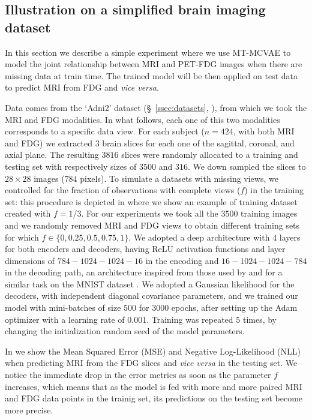 \subsection{Illustration on a simplified brain imaging dataset}
\label{sec:proof_of_concept}

In this section we describe a simple experiment where we use MT-MCVAE to model the joint relationship between MRI and PET-FDG images when there are missing data at train time.
The trained model will be then applied on test data to predict MRI from FDG and \textit{vice versa}.

Data comes from the `Adni2' dataset (\S~\ref{ssec:datasets}, ), from which we took the MRI and FDG modalities.
In what follows, each one of this two modalities corresponds to a specific data view.
For each subject ($n=424$, with both MRI and FDG) we extracted $3$ brain slices for each one of the sagittal, coronal, and axial plane.
The resulting $3816$ slices were randomly allocated to a training and testing set with respectively sizes of $3500$ and $316$.
We down sampled the slices to $28 \times 28$ images ($784$ pixels).
%
To simulate a datasets with missing views, we controlled for the fraction of observations with complete views ($f$) in the training set:
this procedure is depicted in  where we show an example of training dataset created with $f=1/3$.
%
For our experiments we took all the $3500$ training images and we randomly removed MRI and FDG views to obtain different training sets for which $f \in \{0, 0.25, 0.5, 0.75, 1\}$.
We adopted a deep architecture with $4$ layers for both encoders and decoders, having ReLU activation functions and layer dimensions of $784-1024-1024-16$ in the encoding and $16-1024-1024-784$ in the decoding path,
an architecture inspired from those used by \cite{dcca1} and \cite{dcca2} for a similar task on the MNIST dataset \citep{mnist}.
We adopted a Gaussian likelihood for the decoders, with independent diagonal covariance parameters, and we trained our model with mini-batches of size $500$ for $3000$ epochs, after setting up the Adam optimizer with a learning rate of 0.001.
Training was repeated $5$ times, by changing the initialization random seed of the model parameters.



In  we show the Mean Squared Error (MSE) and Negative Log-Likelihood (NLL) when predicting MRI from the FDG slices and \textit{vice versa} in the testing set.
We notice the immediate drop in the error metrics as soon as the parameter $f$ increases, which means that as the model is fed with more and more paired MRI and FDG data points in the trainig set, its predictions on the testing set become more precise.
%

